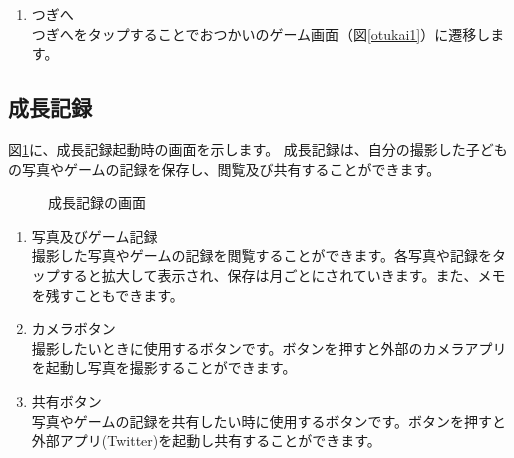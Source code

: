\documentclass[a4j]{jarticle}
\begin{document}
\begin{enumerate}
  \renewcommand{\labelenumi}{\textcircled{\scriptsize \theenumi}}
\item つぎへ\\
  つぎへをタップすることでおつかいのゲーム画面（図\ref{otukai1}）に遷移します。
\end{enumerate}


\newpage
\subsection{成長記録}\label{grow}
図\ref{Grow}に、成長記録起動時の画面を示します。
成長記録は、自分の撮影した子どもの写真やゲームの記録を保存し、閲覧及び共有することができます。

\begin{figure}[H]
    \begin{center}
    \caption {成長記録の画面}
    \label{Grow}
    \end{center}
\end{figure}

\begin{enumerate}
  \renewcommand{\labelenumi}{\textcircled{\scriptsize \theenumi}}
  \item 写真及びゲーム記録\\
       撮影した写真やゲームの記録を閲覧することができます。各写真や記録をタップすると拡大して表示され、保存は月ごとにされていきます。また、メモを残すこともできます。
  \item カメラボタン\\
        撮影したいときに使用するボタンです。ボタンを押すと外部のカメラアプリを起動し写真を撮影することができます。
  \item 共有ボタン　\label{enum:share}\\
        写真やゲームの記録を共有したい時に使用するボタンです。ボタンを押すと外部アプリ(Twitter)を起動し共有することができます。
\end{enumerate}
\end{document}

